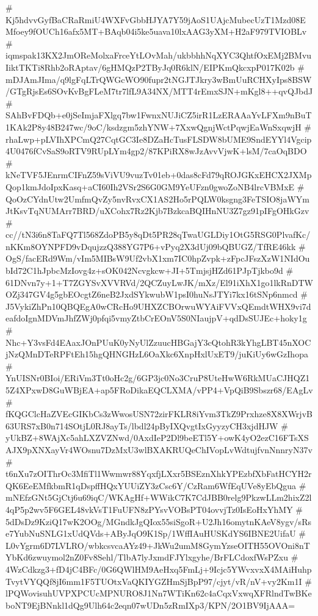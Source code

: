 # Kj5hdvvGyfBaCRaRmiU4WXFvGbbHJYA7Y59jAoS1UAjcMubecUzT1Mzd08EMfoey9fOUCh16afx5MT+BAqb04i5ke5uava10lxAAG3yXM+H2aF979TVIOBLv
# iqmspak13KX2JmOReMolxaFrceYtLOvMah/ukbbhhNqXYC3QhtfOxEMj2BMvuIiktTKTi8Rhb2oRAptav/6gHMQzP2TByJq0R6klN/EIPKmQkcxpP017K02b
# mDJAmJIma/q9lgFqLTrQWGcWO90fupr2tNGJTJkry3wBmUuRCHXyIps8BSW/GTgRjsEs6SOvKvBgFLeM7tr7lfL9A34NX/MTT4rEmxSJN+mKgl8++qvQJbdJ
# SAhBvFDQb+e0jSeImjaFXlgq7bw1FwnxNUJiCZ5irR1LzERAAaYvLFXm9nBuT1KAk2P8y48B247wc/9oC/ksdzgm5zhYNW+7XxwQgnjWctPqwjEaWnSxqwjH
# rhaLwp+pLVIhXPCmQ27CqtGC3Ie8DZaHcTusFLSDW8bUME9SndEYYl4Vgcip4U0476fCvSaS9oRTV9RUpLYm4gp2/87KPiRX8wJzAvvVjwK+lsM/7caOqBDO
# kNeTVF5JEnrmCIFnZ59sViVU9vuzTv01eb+0das8cFd79qROJGKxEHCX2JXMpQop1kmJdoIpxKasq+aCI60Ih2VSr2S6G0GM9YeUFzn0gwoZoNB4lrcVBMxE
# QoOzCYdnUtw2UmfmQvZy5nvRvxCX1AS2Ho5rPQLW0ksgng3FeTSIO8jaWYmJtKsvTqNUMArr7BRD/uXCohx7Rz2Kjb7BzkcaBQIHnNU3Z7gz91pIFgOHkGzv
# cc//tN3i6n8TaFQ7Tl568ZdoPB5y8qDt5PR28qTwaUGLDiy1OtG5RSG0PlvafKc/nKKm8OYNPFD9vDqujzzQ388YG7P6+vPyq2X3dUj09bQBUGZ/TfRE46kk
# OgS/facERd9Wm/vIm5MIBsW9Uf2vbX1xm7IC0hpZvpk+zFpcJFszXzW1NIdOubId72C1hJpbcMzIovg4z+sOK042Ncvgkcw+JI+5TmjsjHZd61PJpTjkbo9d
# 61DNvn7y+1+T7ZGYSvXVVRVd/2QCZuyLwJK/mXz/El91iXhX1go1lkRnDTWOZj347GV4g5gbEOcgtZ6neB2JxdSYkwubW1psI0huNsJTYi7kx16tSNp6nmcd
# J5VykiZhPn10QBQEgA0wCRcHo9UHXZCBOrwuWYAiFVVxQEmdtWHX9vi7deafdoIgnMDVmJhfZWj0pfqi5vmyZtbCrEOnV5S0NIaujpV+qdDsSUJEc+hoky1g
# Nhc+Y3vsFd4EAaxJOnPUuK0yNyUlZzuucHBGajY3cQtohR3kYhgLBT45nXOCjNzQMnDTeRPFtEh15hgQHNGHzL6OaXkc6XnpHxlUxET9/juKiUy6wGzIhopa
# YnUISNr0BIoi/ERiVm3Tt0oHc2g/6GP3jc0No3CruP8UteHwW6RkMUaCJHQZ15Z4XPxwD8GuWBjEA+ap5FRoDikaEQCLXMA/vPP4+VpQiB9Sbszr68/EAgLv
# fKQGClcHaZVEcGIKbCs3zWwosUSN72zirFKLR8iYvm3TkZ9Prxhze8X8XWrjvB63URS7xB0n714SOtjL0RJ8ayTs/lbdl24pByIXQvgtIxGyyzyCH3xjdHJW
# yUkBZ+8WAjXc5ahLXZVZNwd/0AxdIeP2Dl9beETl5Y+owK4yO2ezC16FTsXSAJX9pXNXayVr4WOsnu7DzMxU3wlBXAKRUQeChIVopLvWdtujfvnNnnryN37v
# t6nXu7zOIThrOc3MfiTl1Wwmwr88YqxfjLXxr5BSEznXhkYPEzbfXbFatHCYH2rQK6EeEMfkbmR1qDspffHQxYUUiZY3zCsc6Y/CzRam6WfEqUVe8yEbQgua
# mNEfzGNt5GjCtj6u69iqC/WKAgHf+WWikC7K7CdJBB0relg9PkzwLLm2hixZ2l4qP5p2wv5F6GEL48vkVsT1FuUFN8zPYsvVOBsPT04ovvjTz0IsEoHxYhMY
# 5dDsDz9KziQ17wK2OOg/MGndkJgQIox55siSgoR+U2Jh16omytnKAeV8ygv/sRse7YubNuSNLG1xUdQVds+AByJqO9K1Sp/1WffIAuHUSKdYS6IBNE2UifaU
# L0vYgrm6D7LVLRO/wbkcsvcaAYz49+JkWu2umM8GymYzseOITH55OVOni8nTYbKd6zwuymol2nZ0Fv8Sehl/TlbA7lyJxmdFJYlxgyhe/BrFLCdoxfWsPZxu
# 4WzCdkzg3+fD4jC4BFc/0G6QWlHM9AeHxq5FmLj+9Icjc5YWvxvxX4MAiHuhpTvytVYQQf8jI6mm1F5TUOtxVaQKIYGZHmSjBpP97/cjyt/vR/nV+vy2Km1I
# lPQWovisuhUVPXPCUcMPNURO8J1Nn7WTiKn62c4aCqxVxwqXFRlndTwBKeboNT9EjBNnkl1dQg9Ulh64c2eqn07wUDn5zRmIXp3/KPN/2O1BV9IjAAA=
